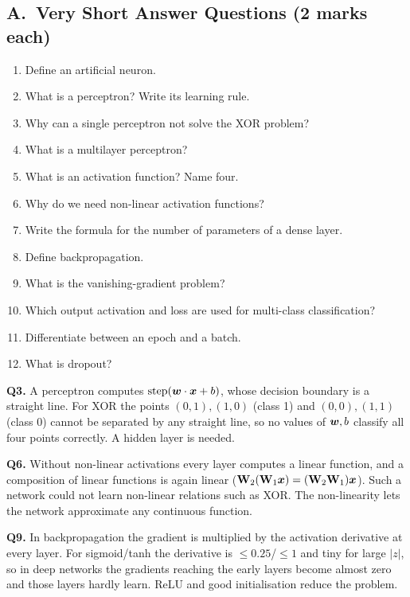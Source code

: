 \subsection*{A.\ Very Short Answer Questions (2 marks each)}
\begin{enumerate}
  \item Define an artificial neuron. 
  \item What is a perceptron? Write its learning rule. 
  \item Why can a single perceptron not solve the XOR problem? 
  \item What is a multilayer perceptron? 
  \item What is an activation function? Name four. 
  \item Why do we need non-linear activation functions? 
  \item Write the formula for the number of parameters of a dense layer. 
  \item Define backpropagation. 
  \item What is the vanishing-gradient problem? 
  \item Which output activation and loss are used for multi-class classification? 
  \item Differentiate between an epoch and a batch. 
  \item What is dropout? 
\end{enumerate}

\begin{modelans}[: Q3, Q6 and Q9]
\textbf{Q3.} A perceptron computes $\text{step}(\boldsymbol{w}\cdot\boldsymbol{x}+b)$, whose decision boundary is a straight line. For XOR the points $(0,1),(1,0)$ (class 1) and $(0,0),(1,1)$ (class 0) cannot be separated by any straight line, so no values of $\boldsymbol{w},b$ classify all four points correctly. A hidden layer is needed.\par
\textbf{Q6.} Without non-linear activations every layer computes a linear function, and a composition of linear functions is again linear ($\mathbf W_2(\mathbf W_1\boldsymbol{x})=(\mathbf W_2\mathbf W_1)\boldsymbol{x}$). Such a network could not learn non-linear relations such as XOR. The non-linearity lets the network approximate any continuous function.\par
\textbf{Q9.} In backpropagation the gradient is multiplied by the activation derivative at every layer. For sigmoid/tanh the derivative is $\le0.25$/$\le1$ and tiny for large $|z|$, so in deep networks the gradients reaching the early layers become almost zero and those layers hardly learn. ReLU and good initialisation reduce the problem.
\end{modelans}

